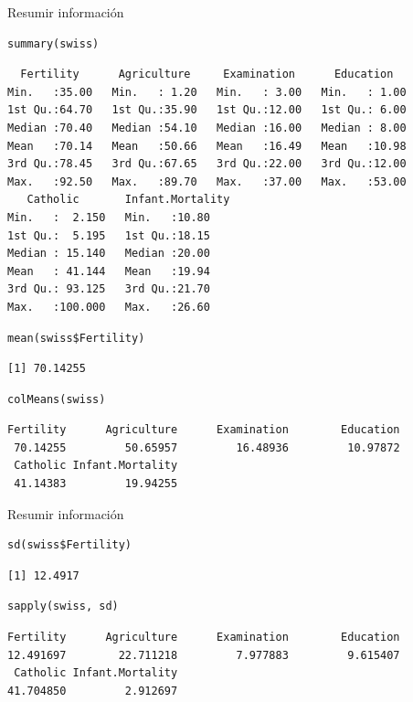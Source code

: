 \documentclass[xcolor={usenames,svgnames,dvipsnames}]{beamer}
\begin{document}
\begin{frame}[fragile,label=sec-2-1]{Resumir información}
 \lstset{language=R,numbers=none}
\begin{lstlisting}
summary(swiss)
\end{lstlisting}

\begin{verbatim}
  Fertility      Agriculture     Examination      Education    
Min.   :35.00   Min.   : 1.20   Min.   : 3.00   Min.   : 1.00  
1st Qu.:64.70   1st Qu.:35.90   1st Qu.:12.00   1st Qu.: 6.00  
Median :70.40   Median :54.10   Median :16.00   Median : 8.00  
Mean   :70.14   Mean   :50.66   Mean   :16.49   Mean   :10.98  
3rd Qu.:78.45   3rd Qu.:67.65   3rd Qu.:22.00   3rd Qu.:12.00  
Max.   :92.50   Max.   :89.70   Max.   :37.00   Max.   :53.00  
   Catholic       Infant.Mortality
Min.   :  2.150   Min.   :10.80   
1st Qu.:  5.195   1st Qu.:18.15   
Median : 15.140   Median :20.00   
Mean   : 41.144   Mean   :19.94   
3rd Qu.: 93.125   3rd Qu.:21.70   
Max.   :100.000   Max.   :26.60
\end{verbatim}

\lstset{language=R,numbers=none}
\begin{lstlisting}
mean(swiss$Fertility)
\end{lstlisting}

\begin{verbatim}
[1] 70.14255
\end{verbatim}

\lstset{language=R,numbers=none}
\begin{lstlisting}
colMeans(swiss)
\end{lstlisting}

\begin{verbatim}
Fertility      Agriculture      Examination        Education 
 70.14255         50.65957         16.48936         10.97872 
 Catholic Infant.Mortality 
 41.14383         19.94255
\end{verbatim}
\end{frame}
\begin{frame}[fragile,label=sec-2-2]{Resumir información}
 \lstset{language=R,numbers=none}
\begin{lstlisting}
sd(swiss$Fertility)
\end{lstlisting}

\begin{verbatim}
[1] 12.4917
\end{verbatim}

\lstset{language=R,numbers=none}
\begin{lstlisting}
sapply(swiss, sd)
\end{lstlisting}

\begin{verbatim}
Fertility      Agriculture      Examination        Education 
12.491697        22.711218         7.977883         9.615407 
 Catholic Infant.Mortality 
41.704850         2.912697
\end{verbatim}
\end{frame}
\end{document}
